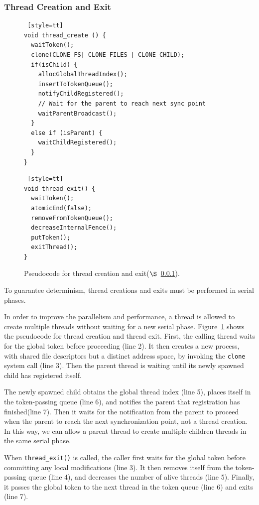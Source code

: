 \subsubsection{Thread Creation and Exit}

\label{sec:threadcreation}

\begin{figure}
\begin{lstlisting} [style=tt]
void thread_create () {
  waitToken();
  clone(CLONE_FS| CLONE_FILES | CLONE_CHILD);
  if(isChild) {
    allocGlobalThreadIndex();
    insertToTokenQueue();
    notifyChildRegistered();
	// Wait for the parent to reach next sync point
    waitParentBroadcast();	
  }
  else if (isParent) {
    waitChildRegistered();
  }
}
\end{lstlisting}
\begin{lstlisting} [style=tt]
void thread_exit() {
  waitToken();
  atomicEnd(false);
  removeFromTokenQueue();
  decreaseInternalFence();
  putToken();
  exitThread(); 
}
\end{lstlisting}
\caption{Pseudocode for thread creation and exit($\S$~\ref{sec:threadcreation}).
\label{fig:threadcreation}
}
\end{figure}

To guarantee determinism, thread creations and exits must be performed in serial phases. 

In order to improve the parallelism and performance, a thread is allowed to create multiple threads without waiting for a new serial phase. Figure~\ref{fig:threadcreation} shows the pseudocode for thread creation and thread exit. First, the calling thread waits for the global token before proceeding (line 2). It then creates a new process, with shared file descriptors but a distinct address space, by invoking the \texttt{clone} system call (line 3).  Then the parent thread is waiting until its newly spawned child has registered itself. 

The newly spawned child obtains the global thread index (line 5), places itself in the token-passing queue (line 6), and notifies the parent that registration has finished(line 7). Then it waits for the notification from the parent to proceed when the parent to reach the next synchronization point, not a thread creation.  In this way, we can allow a parent thread to create multiple children threads in the same serial phase. 

When \texttt{thread\_exit()} is called, the caller first waits for the global token before committing any local modifications (line 3). It then removes itself from the token-passing queue (line 4), and decreases the number of alive threads (line 5). Finally, it passes the global token to the next thread in the token queue (line 6) and exits (line 7).

